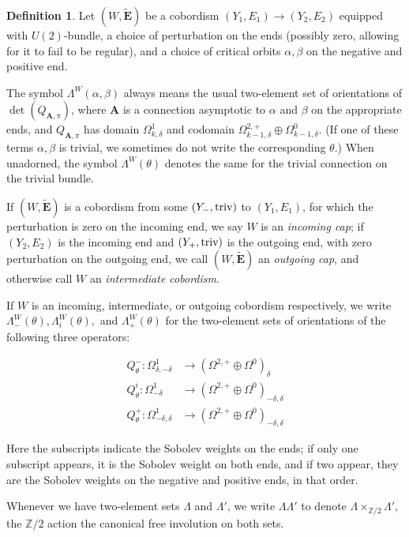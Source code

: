 \documentclass{memo-l}
\theoremstyle{definition}
\newtheorem{definition}[theorem]{Definition}
\theoremstyle{remark}
\numberwithin{section}{chapter}
\numberwithin{equation}{chapter}
\begin{document}
\begin{definition}Let $(W,\widetilde{\mathbf{E}})$ be a cobordism $(Y_1, E_1) \to (Y_2, E_2)$ equipped with $U(2)$-bundle, a choice of perturbation on the ends (possibly zero, allowing for it to fail to be regular), and a choice of critical orbits $\alpha, \beta$ on the negative and positive end.

The symbol $\Lambda^W(\alpha, \beta)$ always means the usual two-element set of orientations of $\det(Q_{\mathbf{A},\pi})$, where $\mathbf{A}$ is a connection asymptotic to $\alpha$ and $\beta$ on the appropriate ends, and $Q_{\mathbf{A},\pi}$ has domain $\Omega^1_{k,\delta}$ and codomain $\Omega^{2,+}_{k-1,\delta} \oplus \Omega^0_{k-1,\delta}$. (If one of these terms $\alpha, \beta$ is trivial, we sometimes do not write the corresponding $\theta$.) When unadorned, the symbol $\Lambda^W(\theta)$ denotes the same for the trivial connection on the trivial bundle.

If $(W,\widetilde{\mathbf{E}})$ is a cobordism from some $(Y_-, \textup{triv})$ to $(Y_1, E_1)$, for which the perturbation is zero on the incoming end, we say $W$ is an \emph{incoming cap}; if $(Y_2, E_2)$ is the incoming end and $(Y_+, \textup{triv})$ is the outgoing end, with zero perturbation on the outgoing end, we call $(W,\widetilde{\mathbf{E}})$ an \emph{outgoing cap}, and otherwise call $W$ an \emph{intermediate cobordism}.

If $W$ is an incoming, intermediate, or outgoing cobordism respectively, we write $\Lambda^W_-(\theta), \Lambda_i^W(\theta), $ and $\Lambda^W_+(\theta)$ for the two-element sets of orientations of the following three operators:

\begin{align*}Q^-_{\theta}: \Omega^1_{\delta, -\delta} &\to (\Omega^{2,+} \oplus \Omega^{0})_{\delta}\\
Q^i_\theta: \Omega^1_{-\delta} &\to (\Omega^{2,+} \oplus \Omega^{0})_{-\delta, \delta}\\
Q^+_\theta: \Omega^1_{-\delta,\delta} &\to (\Omega^{2,+} \oplus \Omega^0)_{-\delta, \delta}\end{align*}

Here the subscripts indicate the Sobolev weights on the ends; if only one subscript appears, it is the Sobolev weight on both ends, and if two appear, they are the Sobolev weights on the negative and positive ends, in that order.

Whenever we have two-element sets $\Lambda$ and $\Lambda'$, we write $\Lambda \Lambda'$ to denote $\Lambda \times_{\mathbb Z/2} \Lambda'$, the $\mathbb Z/2$ action the canonical free involution on both sets.
\end{definition}
\end{document}
